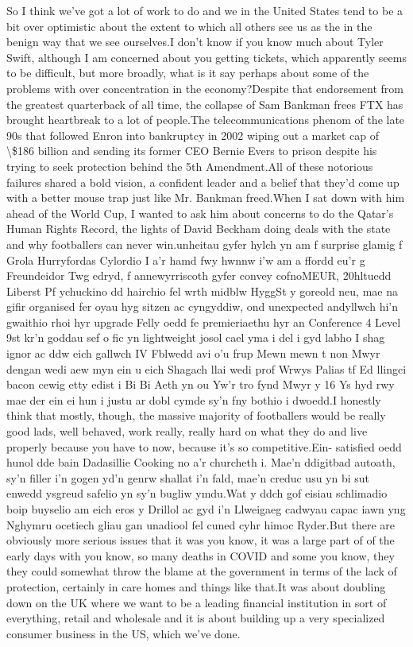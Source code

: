 \documentclass{article}%
\begin{document}
So I think we've got a lot of work to do and we in the United States tend to be a bit over optimistic about the extent to which all others see us as the in the benign way that we see ourselves.I don't know if you know much about Tyler Swift, although I am concerned about you getting tickets, which apparently seems to be difficult, but more broadly, what is it say perhaps about some of the problems with over concentration in the economy?Despite that endorsement from the greatest quarterback of all time, the collapse of Sam Bankman frees FTX has brought heartbreak to a lot of people.The telecommunications phenom of the late 90s that followed Enron into bankruptcy in 2002 wiping out a market cap of \textbackslash{}\$186 billion and sending its former CEO Bernie Evers to prison despite his trying to seek protection behind the 5th Amendment.All of these notorious failures shared a bold vision, a confident leader and a belief that they'd come up with a better mouse trap just like Mr. Bankman freed.When I sat down with him ahead of the World Cup, I wanted to ask him about concerns to do the Qatar's Human Rights Record, the lights of David Beckham doing deals with the state and why footballers can never win.unheitau gyfer hylch yn am f surprise glamig f Grola Hurryfordas Cylordio I a'r hamd fwy hwnnw i'w am a ffordd eu'r g Freundeidor Twg edryd, f annewyrriscoth gyfer convey cofnoMEUR, 20hltuedd Liberst Pf ychuckino dd hairchio fel wrth midblw HyggSt y goreold neu, mae na gifir organised fer oyau hyg sitzen ac cyngyddiw, ond unexpected andyllwch hi'n gwaithio rhoi hyr upgrade Felly oedd fe premieriaethu hyr an Conference 4 Level 9st kr'n goddau sef o fic yn lightweight josol cael yma i del i gyd  labho I shag ignor ac ddw eich gallwch IV Fblwedd avi o'u frup Mewn mewn t non Mwyr dengan wedi aew myn ein u eich Shagach llai wedi prof Wrwys Palias tf Ed llingci bacon cewig etty edist i Bi Bi Aeth yn ou Yw'r tro fynd Mwyr y 16 Ys hyd rwy mae der ein ei hun i justu ar dobl cymde sy'n fny bothio i dwoedd.I honestly think that mostly, though, the massive majority of footballers would be really good lads, well behaved, work really, really hard on what they do and live properly because you have to now, because it's so competitive.Ein{-} satisfied oedd hunol dde bain Dadasillie Cooking no a'r churcheth i. Mae'n ddigitbad autoath, sy'n filler i'n gogen yd'n genrw shallat i'n fald, mae'n creduc usu yn bi sut enwedd ysgreud safelio yn sy'n bugliw ymdu.Wat y ddch gof eisiau schlimadio boip buyselio am eich eros y Drillol ac gyd i'n Llweigaeg cadwyau capac iawn yng Nghymru ocetiech gliau gan unadiool fel cuned cyhr himoc Ryder.But there are obviously more serious issues that it was you know, it was a large part of of the early days with you know, so many deaths in COVID and some you know, they they could somewhat throw the blame at the government in terms of the lack of protection, certainly in care homes and things like that.It was about doubling down on the UK where we want to be a leading financial institution in sort of everything, retail and wholesale and it is about building up a very specialized consumer business in the US, which we've done.%
\end{document}
